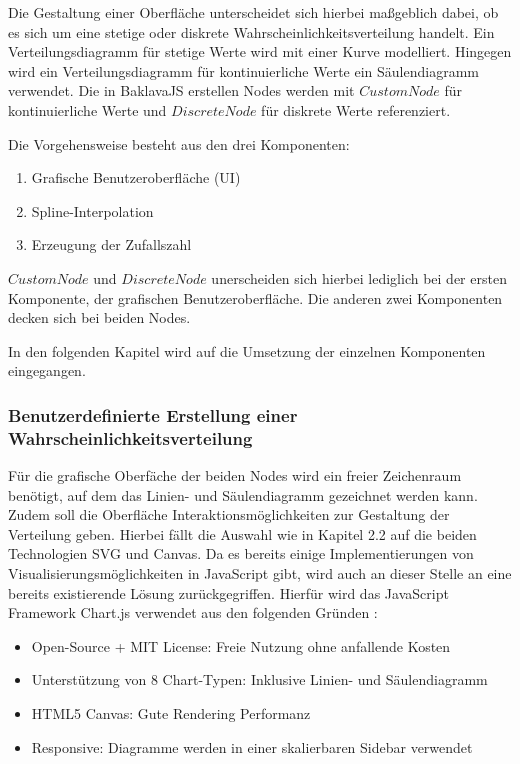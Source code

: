 Die Gestaltung einer Oberfläche unterscheidet sich hierbei maßgeblich dabei, ob es sich um eine stetige oder diskrete Wahrscheinlichkeitsverteilung handelt. Ein Verteilungsdiagramm für stetige Werte wird mit einer Kurve modelliert. Hingegen wird ein Verteilungsdiagramm für kontinuierliche Werte ein Säulendiagramm verwendet. Die in BaklavaJS erstellen Nodes werden mit $CustomNode$ für kontinuierliche Werte und $DiscreteNode$ für diskrete Werte referenziert.

Die Vorgehensweise besteht aus den drei Komponenten: 
\begin{enumerate}
    \item Grafische Benutzeroberfläche (UI)
    \item Spline-Interpolation
    \item Erzeugung der Zufallszahl
\end{enumerate}
$CustomNode$ und $DiscreteNode$ unerscheiden sich hierbei lediglich bei der ersten Komponente, der grafischen Benutzeroberfläche. Die anderen zwei Komponenten decken sich bei beiden Nodes.

In den folgenden Kapitel wird auf die Umsetzung der einzelnen Komponenten eingegangen.

\subsubsection{Benutzerdefinierte Erstellung einer Wahrscheinlichkeitsverteilung}

Für die grafische Oberfäche der beiden Nodes wird ein freier Zeichenraum benötigt, auf dem das Linien- und Säulendiagramm gezeichnet werden kann. Zudem soll die Oberfläche Interaktionsmöglichkeiten zur Gestaltung der Verteilung geben. Hierbei fällt die Auswahl wie in Kapitel 2.2 auf die beiden Technologien SVG und Canvas. Da es bereits einige Implementierungen von Visualisierungsmöglichkeiten in JavaScript gibt, wird auch an dieser Stelle an eine bereits existierende Lösung zurückgegriffen. Hierfür wird das JavaScript Framework Chart.js verwendet aus den folgenden Gründen \cite{chartjs}:
\begin{itemize}
    \item Open-Source + MIT License: Freie Nutzung ohne anfallende Kosten
    \item Unterstützung von 8 Chart-Typen: Inklusive Linien- und Säulendiagramm
    \item HTML5 Canvas: Gute Rendering Performanz
    \item Responsive: Diagramme werden in einer skalierbaren Sidebar verwendet
\end{itemize}

